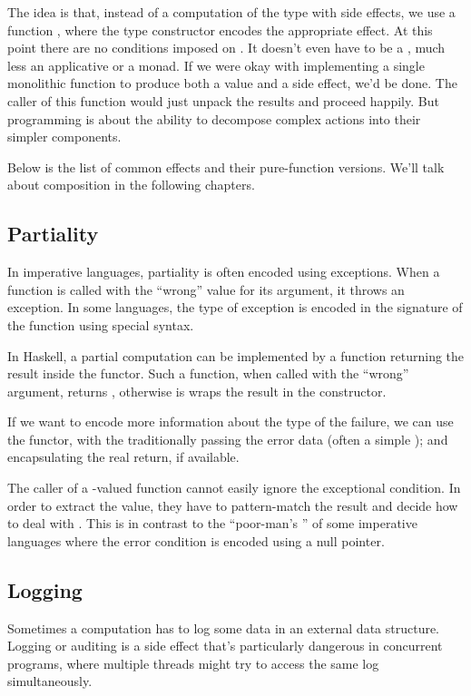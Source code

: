 \documentclass[DaoFP]{subfiles}
\begin{document}
The idea is that, instead of a computation of the type  with side effects, we use a function , where the type constructor  encodes the appropriate effect. At this point there are no conditions imposed on . It doesn't even have to be a , much less an applicative or a monad. If we were okay with implementing a single monolithic function to produce both a value and a side effect, we'd be done. The caller of this function would just unpack the results and proceed happily. But programming is about the ability to decompose complex actions into their simpler components. 

Below is the list of common effects and their pure-function versions. We'll talk about composition in the following chapters.

\subsection{Partiality}
In imperative languages, partiality is often encoded using exceptions. When a function is called with the ``wrong'' value for its argument, it throws an exception. In some languages, the type of exception is encoded in the signature of the function using special syntax. 

In Haskell, a partial computation can be implemented by a function returning the result inside the  functor. Such a function, when called with the ``wrong'' argument, returns , otherwise is wraps the result in the  constructor.

If we want to encode more information about the type of the failure, we can use the  functor, with the  traditionally passing the error data (often a simple ); and  encapsulating the real return, if available.

The caller of a -valued function cannot easily ignore the exceptional condition. In order to extract the value, they have to pattern-match the result and decide how to deal with . This is in contrast to the ``poor-man's '' of some imperative languages where the error condition is encoded using a null pointer.

\subsection{Logging}

Sometimes a computation has to log some data in an external data structure. Logging or auditing is a side effect that's particularly dangerous in concurrent programs, where multiple threads might try to access the same log simultaneously.
\end{document}
